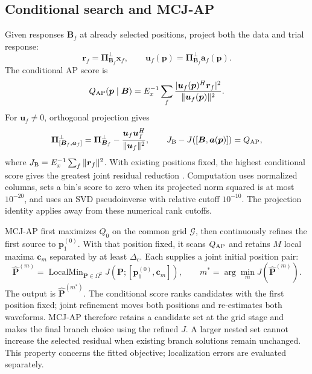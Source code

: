 \documentclass[a4paper,fleqn,review]{cas-sc}
\begin{document}
\subsection{Conditional search and MCJ-AP}
Given responses $\bm B_f$ at already selected positions, project both the data and trial response:
\begin{equation}
\bm r_f=\bm\Pi_{\bm B_f}^{\perp}\bm x_f,\qquad
\bm u_f(\bm p)=\bm\Pi_{\bm B_f}^{\perp}\bm a_f(\bm p).
\end{equation}
The conditional AP score is
\begin{equation}
Q_{\rm AP}(\bm p\mid\bm B)=E_x^{-1}\sum_f
 \frac{|\bm u_f(\bm p)^H\bm r_f|^2}{\|\bm u_f(\bm p)\|^2}.
\label{en:conditional}
\end{equation}
For $\bm u_f\ne0$, orthogonal projection gives
\begin{equation}
\bm\Pi_{[\bm B_f,\bm a_f]}^{\perp}
=\bm\Pi_{\bm B_f}^{\perp}-\frac{\bm u_f\bm u_f^H}{\|\bm u_f\|^2},
\qquad J_{\rm B}-J([\bm B,\bm a(\bm p)])=Q_{\rm AP},
\label{en:gain}
\end{equation}
where $J_{\rm B}=E_x^{-1}\sum_f\|\bm r_f\|^2$. With existing positions fixed, the highest conditional score gives the greatest joint residual reduction \cite{ChenHudsonYao2002}. Computation uses normalized columns, sets a bin's score to zero when its projected norm squared is at most $10^{-20}$, and uses an SVD pseudoinverse with relative cutoff $10^{-10}$. The projection identity applies away from these numerical rank cutoffs.

MCJ-AP first maximizes $Q_0$ on the common grid $\mathcal G$, then continuously refines the first source to $\bm p_1^{(0)}$. With that position fixed, it scans $Q_{\rm AP}$ and retains $M$ local maxima $\bm c_m$ separated by at least $\Delta_c$. Each supplies a joint initial position pair:
\begin{equation}
\widehat{\bm P}^{(m)}=\operatorname{LocalMin}_{\bm P\in\Omega^2}
 J(\bm P;[\bm p_1^{(0)},\bm c_m]),\qquad
m^*=\arg\min_m J(\widehat{\bm P}^{(m)}).
\label{en:branch}
\end{equation}
The output is $\widehat{\bm P}^{(m^*)}$. The conditional score ranks candidates with the first position fixed; joint refinement moves both positions and re-estimates both waveforms. MCJ-AP therefore retains a candidate set at the grid stage and makes the final branch choice using the refined $J$. A larger nested set cannot increase the selected residual when existing branch solutions remain unchanged. This property concerns the fitted objective; localization errors are evaluated separately.
\end{document}

